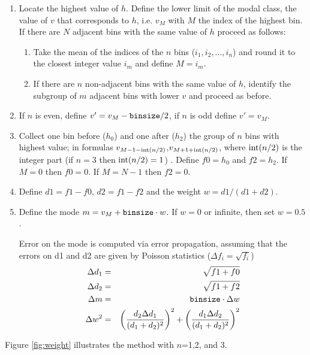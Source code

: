 \begin{enumerate}
\item Locate the highest value of $h$. Define the lower limit of the
  modal class, the value of $v$ that corresponds to $h$, i.e. $v_M$ with $M$ the index of the highest bin. If
  there are $N$ adjacent  bins with the same value of $h$ proceed as follows:
  \begin{enumerate}
    \item Take the mean of the indices of the $n$ bins ($i_1, i_2, ..., i_n$) and round it to the closest integer value $i_m$ and define $M=i_m$.
    \item If there are $n$ non-adjacent bins with the same value of $h$,
      identify the subgroup of $m$ adjacent bins with lower $v$ and
      proceed as before.
    \end{enumerate}
 \item If $n$ is even, define  $v'=v_M-{\tt binsize}/2$, if $n$ is odd define $v'=v_M$.

 \item Collect one bin before ($h_0$) and one after ($h_2$) the group
   of $n$ bins with highest value; in formulas
   $v_{M-1-{\rm int}(n/2)}$,$v_{M+1+{\rm int}(n/2)}$, where
   ${\rm int}(n/2)$ is the integer part (if $n=3$ then
   ${\rm int}(n/2)=1$) . Define $f0=h_0$ and $f2=h_2$. If $M=0$ then
$f0=0$. If $M=N-1$ then $f2=0$.

  
 \item Define $d1 = f1-f0$, $d2 =f1-f2 $ and the weight $w=d1/(d1+d2)$.
 \item Define the mode $m=v_M+{\tt binsize}\cdot w$. If $w=0$ or infinite,
   then set $w=0.5$.

  Error on the mode is computed via error propagation, assuming that the errors on d1 and d2 are given by Poisson statistics ($\Delta f_i = \sqrt{f_i}$)
  \begin{eqnarray}
  \Delta d_1 &=& \sqrt{f1+f0} \nonumber \\
  \Delta d_2 &=& \sqrt{f1+f2} \nonumber \\
    \Delta m &=& {\tt binsize}\cdot \Delta w \nonumber \\
\Delta w^2 &=& \left( \frac{d_2\Delta d_1}{(d_1+d_2)^2} \right)^2 + \left( \frac{d_1 \Delta d_2}{(d_1+d_2)^2}\right)^2 
  \end{eqnarray}

\end{enumerate}
Figure \ref{fig:weight} illustrates the method with $n$=1,2, and 3.

